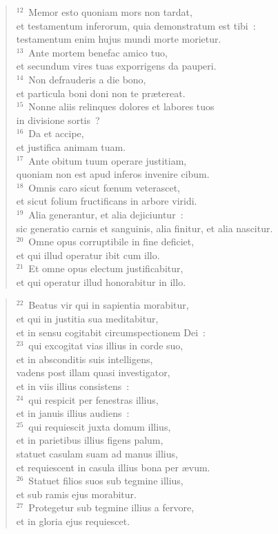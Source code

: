 \begin{verse}
${}^{12}$~Memor esto quoniam mors non tardat,\\ et testamentum inferorum, quia demonstratum est tibi~:\\ testamentum enim hujus mundi morte morietur.\\
${}^{13}$~Ante mortem benefac amico tuo,\\ et secundum vires tuas exporrigens da pauperi.\\
${}^{14}$~Non defrauderis a die bono,\\ et particula boni doni non te pr\ae tereat.\\
${}^{15}$~Nonne aliis relinques dolores et labores tuos\\ in divisione sortis~?\\
${}^{16}$~Da et accipe,\\ et justifica animam tuam.\\
${}^{17}$~Ante obitum tuum operare justitiam,\\ quoniam non est apud inferos invenire cibum.\\
${}^{18}$~Omnis caro sicut fœnum veterascet,\\ et sicut folium fructificans in arbore viridi.\\
${}^{19}$~Alia generantur, et alia dejiciuntur~:\\ sic generatio carnis et sanguinis, alia finitur, et alia nascitur.\\
${}^{20}$~Omne opus corruptibile in fine deficiet,\\ et qui illud operatur ibit cum illo.\\
${}^{21}$~Et omne opus electum justificabitur,\\ et qui operatur illud honorabitur in illo.\end{verse}


\begin{verse}${}^{22}$~Beatus vir qui in sapientia morabitur,\\ et qui in justitia sua meditabitur,\\ et in sensu cogitabit circumspectionem Dei~:\\
${}^{23}$~qui excogitat vias illius in corde suo,\\ et in absconditis suis intelligens,\\ vadens post illam quasi investigator,\\ et in viis illius consistens~:\\
${}^{24}$~qui respicit per fenestras illius,\\ et in januis illius audiens~:\\
${}^{25}$~qui requiescit juxta domum illius,\\ et in parietibus illius figens palum,\\ statuet casulam suam ad manus illius,\\ et requiescent in casula illius bona per \ae vum.\\
${}^{26}$~Statuet filios suos sub tegmine illius,\\ et sub ramis ejus morabitur.\\
${}^{27}$~Protegetur sub tegmine illius a fervore,\\ et in gloria ejus requiescet.\end{verse}


